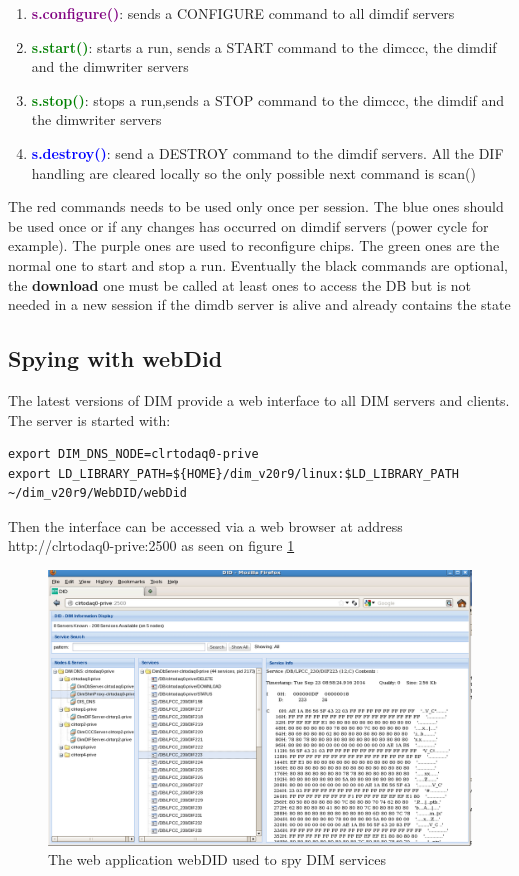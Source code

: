 \documentclass[english]{article}
\begin{document}
\begin{enumerate}
\item \textcolor{purple}{\bf s.configure()}: sends a CONFIGURE command to all dimdif servers




\item \textcolor{green}{\bf s.start()}: starts a run, sends a START command to the dimccc, the dimdif and the dimwriter servers 

\item \textcolor{green}{\bf s.stop()}: stops a run,sends a STOP command to the dimccc, the dimdif and the dimwriter servers
\item \textcolor{blue}{\bf s.destroy()}: send a DESTROY command to the dimdif servers. All the DIF handling are cleared locally so the only possible next command is scan()
\end{enumerate} 

The red commands needs to be used only once per session. The blue ones should be used once or if any changes has occurred on dimdif servers (power cycle for example). The purple ones are used to reconfigure chips. The green ones are the normal one to start and stop a run. Eventually the black commands are optional, the {\bf download} one must be called at least ones to access the DB but is not needed in a new session if the dimdb server is alive and already contains the state 
\subsection{Spying with webDid}
The latest versions of DIM provide a web interface to all DIM servers and clients. The server is started with:
\begin{verbatim}
export DIM_DNS_NODE=clrtodaq0-prive
export LD_LIBRARY_PATH=${HOME}/dim_v20r9/linux:$LD_LIBRARY_PATH
~/dim_v20r9/WebDID/webDid
\end{verbatim}

Then the interface can be accessed via a web browser at address http://clrtodaq0-prive:2500 as seen on figure \ref{webdid}
\begin{figure}[htp]
\centering
\includegraphics[width=1.3\textwidth]{./webDid.png}
\caption{The web application webDID used to spy DIM services}
\label{webdid}
\end{figure}
\end{document}
